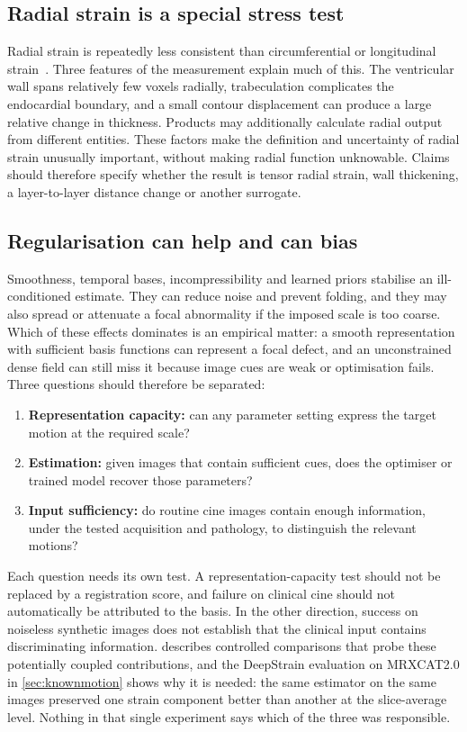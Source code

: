 \subsection{Radial strain is a special stress test}

Radial strain is repeatedly less consistent than circumferential or longitudinal strain~\cite{cao2018,militaru2021}. Three features of the measurement explain much of this. The ventricular wall spans relatively few voxels radially, trabeculation complicates the endocardial boundary, and a small contour displacement can produce a large relative change in thickness. Products may additionally calculate radial output from different entities. These factors make the definition and uncertainty of radial strain unusually important, without making radial function unknowable. Claims should therefore specify whether the result is tensor radial strain, wall thickening, a layer-to-layer distance change or another surrogate.

\subsection{Regularisation can help and can bias}\label{sec:threequestions}

Smoothness, temporal bases, incompressibility and learned priors stabilise an ill-conditioned estimate. They can reduce noise and prevent folding, and they may also spread or attenuate a focal abnormality if the imposed scale is too coarse. Which of these effects dominates is an empirical matter: a smooth representation with sufficient basis functions can represent a focal defect, and an unconstrained dense field can still miss it because image cues are weak or optimisation fails. Three questions should therefore be separated:

\begin{enumerate}
\item \textbf{Representation capacity:} can any parameter setting express the target motion at the required scale?
\item \textbf{Estimation:} given images that contain sufficient cues, does the optimiser or trained model recover those parameters?
\item \textbf{Input sufficiency:} do routine cine images contain enough information, under the tested acquisition and pathology, to distinguish the relevant motions?
\end{enumerate}

Each question needs its own test. A representation-capacity test should not be replaced by a registration score, and failure on clinical cine should not automatically be attributed to the basis. In the other direction, success on noiseless synthetic images does not establish that the clinical input contains discriminating information.  describes controlled comparisons that probe these potentially coupled contributions, and the DeepStrain evaluation on MRXCAT2.0 in \cref{sec:knownmotion} shows why it is needed: the same estimator on the same images preserved one strain component better than another at the slice-average level. Nothing in that single experiment says which of the three was responsible.

